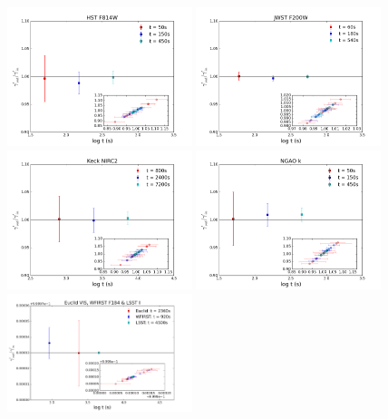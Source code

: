 \documentclass[a4paper,11pt]{article}
\begin{document}
{%
\begin{figure}
\begin{center}
\includegraphics[width=0.48\textwidth]{figures/gamma_0330_anti_4QSOimages_HST.png}
\includegraphics[width=0.48\textwidth]{figures/gamma_0330_anti_4QSOimages_JWST.png} \\
\includegraphics[width=0.48\textwidth]{figures/gamma_0330_anti_4QSOimages_Keck.png}
\includegraphics[width=0.48\textwidth]{figures/gamma_0330_anti_4QSOimages_NGAO.png} \\
\includegraphics[width=0.48\textwidth]{figures/gamma_0330_anti_4QSOimages_EWL.png}

\end{center}
\end{figure}}
\end{document}
